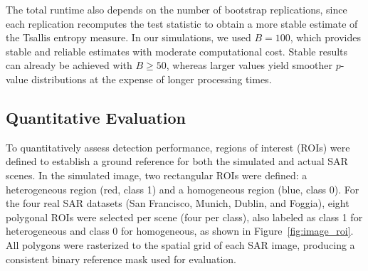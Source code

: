 \documentclass[
  lettersize  journal,
]{IEEEtran}%
\begin{document}
The total runtime also depends on the number of bootstrap replications,
since each replication recomputes the test statistic to obtain a more
stable estimate of the Tsallis entropy measure. In our simulations, we
used \(B=100\), which provides stable and reliable estimates with
moderate computational cost. Stable results can already be achieved with
\(B\geq50\), whereas larger values yield smoother \(p\)-value
distributions at the expense of longer processing times.

\subsection{Quantitative Evaluation}\label{quantitative-evaluation}

To quantitatively assess detection performance, regions of interest
(ROIs) were defined to establish a ground reference for both the
simulated and actual SAR scenes. In the simulated image, two rectangular
ROIs were defined: a heterogeneous region (red, class 1) and a
homogeneous region (blue, class 0). For the four real SAR datasets (San
Francisco, Munich, Dublin, and Foggia), eight polygonal ROIs were
selected per scene (four per class), also labeled as class 1 for
heterogeneous and class 0 for homogeneous, as shown in
Figure~\ref{fig:image_roi}. All polygons were rasterized to the spatial
grid of each SAR image, producing a consistent binary reference mask
used for evaluation.
\end{document}
